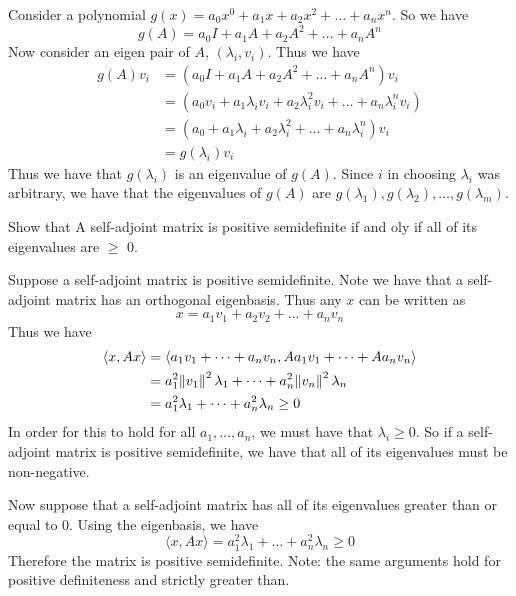 \documentclass{homework}
\begin{document}
\begin{solution}
  Consider a polynomial $g(x) = a_0x^0 + a_1x + a_2x^2 + \dots + a_nx^n$. So we have
  \[ g(A) = a_0I + a_1A + a_2A^2 + \dots + a_nA^n\]
  Now consider an eigen pair of $A$, $(\lambda_i, v_i)$. Thus we have
  \[ \begin{aligned}
      g(A)v_i &= (a_0I + a_1A + a_2A^2 + \dots + a_nA^n)v_i \\
              &= (a_0v_i + a_1\lambda_i v_i + a_2\lambda_i^2v_i + \dots + a_n\lambda_i^n v_i) \\
              &= (a_0 + a_1\lambda_i + a_2\lambda_i^2 + \dots + a_n\lambda_i^n)v_i \\
              &= g(\lambda_i)v_i
     \end{aligned}
  \]
  Thus we have that $g(\lambda_i)$ is an eigenvalue of $g(A)$. Since $i$ in choosing $\lambda_i$ was arbitrary, we have that the eigenvalues of $g(A)$ are $g(\lambda_1),g(\lambda_2),\dots,g(\lambda_m)$.
\end{solution}

\begin{problem}[6-21]
  Show that A self-adjoint matrix is positive semidefinite if and oly if all of its eigenvalues are $\geq$ 0.
\end{problem}

\begin{solution}
  Suppose a self-adjoint matrix is positive semidefinite. Note we have that a self-adjoint matrix has an orthogonal eigenbasis. Thus any $x$ can be written as
  \[x = a_1v_1 + a_2v_2 + \dots + a_nv_n\]
  Thus we have
  \[ 
    \begin{aligned}
      \langle x, Ax\rangle &= \langle a_1v_1 + \dots + a_nv_n, Aa_1v_1 + \dots + Aa_nv_n\rangle \\
                           &= a_1^2\norm{v_1}^2\lambda_1 + \dots + a_n^2\norm{v_n}^2\lambda_n \\
                           &= a_1^2\lambda_1 + \dots + a_n^2\lambda_n \geq 0
    \end{aligned}
  \]
  In order for this to hold for all $a_1,\dots,a_n$, we must have that $\lambda_i \geq 0$. So if a self-adjoint matrix is positive semidefinite, we have that all of its eigenvalues must be non-negative.

  Now suppose that a self-adjoint matrix has all of its eigenvalues greater than or equal to 0. Using the eigenbasis, we have
  \[ \langle x, Ax \rangle = a^2_1 \lambda_1 + \dots + a_n^2\lambda_n \geq 0\]
  Therefore the matrix is positive semidefinite. Note: the same arguments hold for positive definiteness and strictly greater than.
\end{solution}
\end{document}
